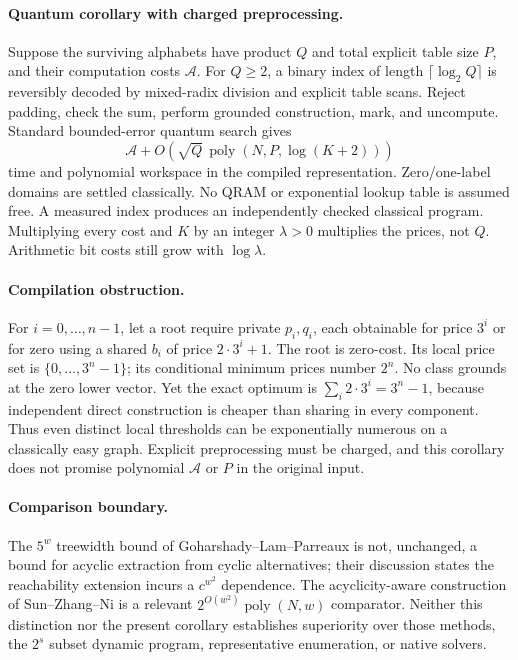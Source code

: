 \paragraph{Quantum corollary with charged preprocessing.}
Suppose the surviving alphabets have product $Q$ and total explicit table size
$P$, and their computation costs $\mathcal A$. For $Q\geq2$, a binary index
of length $\lceil\log_2 Q\rceil$ is reversibly decoded by mixed-radix division
and explicit table scans. Reject padding, check the sum, perform grounded
construction, mark, and uncompute. Standard bounded-error quantum search gives
\[
 \mathcal A+O\!\left(\sqrt Q\,\operatorname{poly}(N,P,\log(K+2))\right)
\]
time and polynomial workspace in the compiled representation. Zero/one-label
domains are settled classically. No QRAM or exponential lookup table is assumed
free. A measured index produces an independently checked classical program.
Multiplying every cost and $K$ by an integer $\lambda>0$ multiplies the prices,
not $Q$. Arithmetic bit costs still grow with $\log\lambda$.

\paragraph{Compilation obstruction.}
For $i=0,\ldots,n-1$, let a root require private $p_i,q_i$, each obtainable
for price $3^i$ or for zero using a shared $b_i$ of price $2\cdot3^i+1$.
The root is zero-cost. Its local price set is
$\{0,\ldots,3^n-1\}$; its conditional minimum prices number $2^n$.
No class grounds at the zero lower vector. Yet the exact optimum is
$\sum_i2\cdot3^i=3^n-1$, because independent direct construction is cheaper
than sharing in every component. Thus even distinct local thresholds can be
exponentially numerous on a classically easy graph. Explicit preprocessing
must be charged, and this corollary does not promise polynomial $\mathcal A$
or $P$ in the original input.

\paragraph{Comparison boundary.}
The $5^w$ treewidth bound of Goharshady--Lam--Parreaux is not, unchanged,
a bound for acyclic extraction from cyclic alternatives; their discussion
states the reachability extension incurs a $c^{w^2}$ dependence. The
acyclicity-aware construction of Sun--Zhang--Ni is a relevant
$2^{O(w^2)}\operatorname{poly}(N,w)$ comparator. Neither this distinction
nor the present corollary establishes superiority over those methods, the
$2^s$ subset dynamic program, representative enumeration, or native solvers.
